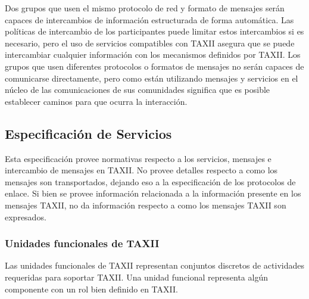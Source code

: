Dos grupos que usen el mismo protocolo de red y formato de mensajes serán 
capaces de intercambios de información estructurada de forma automática. Las 
políticas de intercambio de los participantes puede limitar estos intercambios 
si es necesario, pero el uso de servicios compatibles con TAXII asegura que 
se puede intercambiar cualquier información con los mecanismos definidos por 
TAXII. Los grupos que usen diferentes protocolos o formatos de mensajes no serán 
capaces de comunicarse directamente, pero como están utilizando mensajes y 
servicios en el núcleo de las comunicaciones de sus comunidades significa que es 
posible establecer caminos para que ocurra la interacción.

\subsection{Especificación de Servicios}
Esta especificación provee normativas respecto a los servicios, mensajes e 
intercambio de mensajes en TAXII. No provee detalles respecto a como los 
mensajes son transportados, dejando eso a la especificación de los protocolos de 
enlace. Si bien se provee información relacionada a la información presente en 
los mensajes TAXII, no da información respecto a como los mensajes TAXII son 
expresados.


\subsubsection{Unidades funcionales de TAXII}


Las unidades funcionales de TAXII representan conjuntos discretos de actividades 
requeridas para soportar TAXII. Una unidad funcional representa algún componente 
con un rol bien definido en TAXII.

